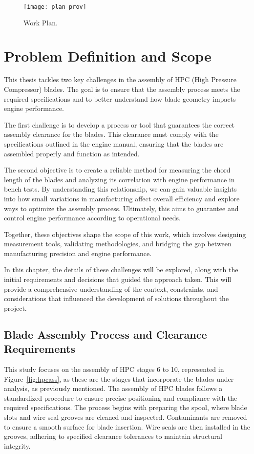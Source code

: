 \begin{figure}[H]
    \centering
    \texttt{[image: plan\_prov]}
    \caption{Work Plan.}
    \label{fig:plan_prov}
\end{figure}



\chapter{Problem Definition and Scope}
\label{cha:definition}

This thesis tackles two key challenges in the assembly of HPC (High Pressure Compressor) blades. The goal is to ensure that the assembly process meets the required specifications and to better understand how blade geometry impacts engine performance.

The first challenge is to develop a process or tool that guarantees the correct assembly clearance for the blades. This clearance must comply with the specifications outlined in the engine manual, ensuring that the blades are assembled properly and function as intended.

The second objective is to create a reliable method for measuring the chord length of the blades and analyzing its correlation with engine performance in bench tests. By understanding this relationship, we can gain valuable insights into how small variations in manufacturing affect overall efficiency and explore ways to optimize the assembly process. Ultimately, this aims to guarantee and control engine performance according to operational needs.

Together, these objectives shape the scope of this work, which involves designing measurement tools, validating methodologies, and bridging the gap between manufacturing precision and engine performance.

In this chapter, the details of these challenges will be explored, along with the initial requirements and decisions that guided the approach taken. This will provide a comprehensive understanding of the context, constraints, and considerations that influenced the development of solutions throughout the project.

\section{Blade Assembly Process and Clearance Requirements}
\label{sec: bladeandclearence}

This study focuses on the assembly of HPC stages 6 to 10, represented in Figure~\ref{fig:hpcass},  as these are the stages that incorporate the blades under analysis, as previously mentioned. The assembly of \gls{HPC} blades follows a standardized procedure to ensure precise positioning and compliance with the required specifications. The process begins with preparing the spool, where blade slots and wire seal grooves are cleaned and inspected. Contaminants are removed to ensure a smooth surface for blade insertion. Wire seals are then installed in the grooves, adhering to specified clearance tolerances to maintain structural integrity.

